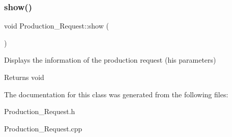 \subsubsection{\texorpdfstring{show()}{show()}}
{\footnotesize\ttfamily void Production\+\_\+\+Request\+::show (\begin{DoxyParamCaption}{ }\end{DoxyParamCaption})}



Displays the information of the production request (his parameters) 

\begin{DoxyReturn}{Returns}
void 
\end{DoxyReturn}


The documentation for this class was generated from the following files\+:\begin{DoxyCompactItemize}
\item 
Production\+\_\+\+Request.\+h\item 
Production\+\_\+\+Request.\+cpp\end{DoxyCompactItemize}
